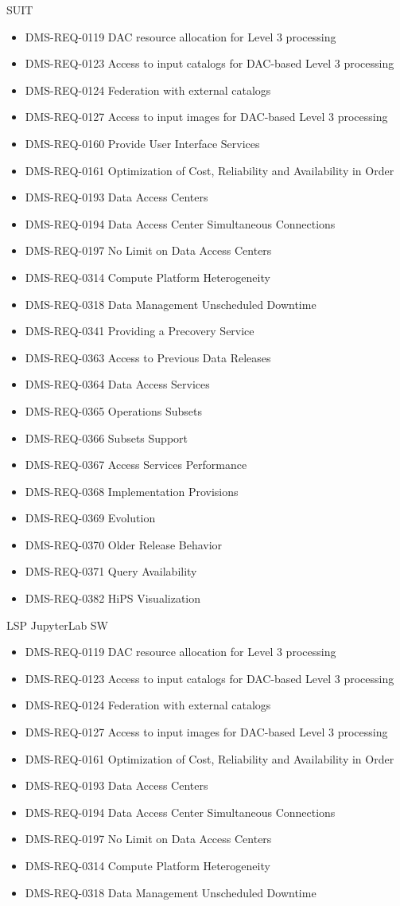 SUIT \begin{itemize}
\item DMS-REQ-0119 DAC resource allocation for Level 3 processing
\item DMS-REQ-0123 Access to input catalogs for DAC-based Level 3 processing
\item DMS-REQ-0124 Federation with external catalogs
\item DMS-REQ-0127 Access to input images for DAC-based Level 3 processing
\item DMS-REQ-0160 Provide User Interface Services
\item DMS-REQ-0161 Optimization of Cost, Reliability and Availability in Order
\item DMS-REQ-0193 Data Access Centers
\item DMS-REQ-0194 Data Access Center Simultaneous Connections
\item DMS-REQ-0197 No Limit on Data Access Centers
\item DMS-REQ-0314 Compute Platform Heterogeneity
\item DMS-REQ-0318 Data Management Unscheduled Downtime
\item DMS-REQ-0341 Providing a Precovery Service
\item DMS-REQ-0363 Access to Previous Data Releases
\item DMS-REQ-0364 Data Access Services
\item DMS-REQ-0365 Operations Subsets
\item DMS-REQ-0366 Subsets Support
\item DMS-REQ-0367 Access Services Performance
\item DMS-REQ-0368 Implementation Provisions
\item DMS-REQ-0369 Evolution
\item DMS-REQ-0370 Older Release Behavior
\item DMS-REQ-0371 Query Availability
\item DMS-REQ-0382 HiPS Visualization
\end{itemize}
LSP JupyterLab SW \begin{itemize}
\item DMS-REQ-0119 DAC resource allocation for Level 3 processing
\item DMS-REQ-0123 Access to input catalogs for DAC-based Level 3 processing
\item DMS-REQ-0124 Federation with external catalogs
\item DMS-REQ-0127 Access to input images for DAC-based Level 3 processing
\item DMS-REQ-0161 Optimization of Cost, Reliability and Availability in Order
\item DMS-REQ-0193 Data Access Centers
\item DMS-REQ-0194 Data Access Center Simultaneous Connections
\item DMS-REQ-0197 No Limit on Data Access Centers
\item DMS-REQ-0314 Compute Platform Heterogeneity
\item DMS-REQ-0318 Data Management Unscheduled Downtime
\end{itemize}
